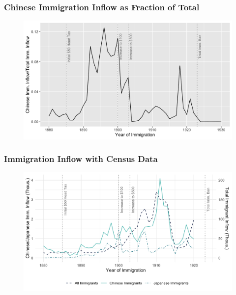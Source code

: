 \documentclass[pdf]{beamer}
\begin{document}
\begin{frame}[label = flow_diff]
	\frametitle{Chinese Immigration Inflow as Fraction of Total}
    \centering
	\begin{figure}[H]
		\begin{center}
			\includegraphics[width=\textwidth]{../../figs/21jul23/flowpct.png}
		\end{center}
	\end{figure}
    \hyperlink{flow_reg}{}
\end{frame}


\begin{frame}[label = census_flow]
	\frametitle{Immigration Inflow with Census Data}
    \centering
	\begin{figure}[H]
		\begin{center}
			\includegraphics[width=\textwidth]{../../figs/21jul23/fig2_flow_jap.png}
		\end{center}
	\end{figure}
    \hyperlink{tab2_flow}{}
\end{frame}
\end{document}
